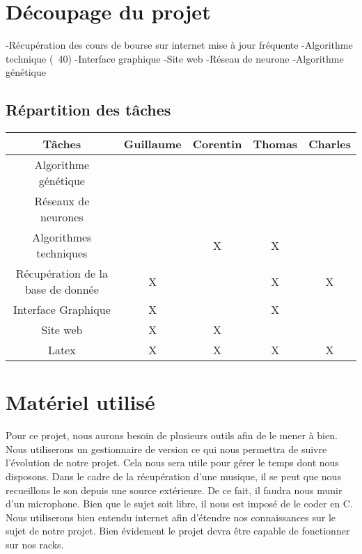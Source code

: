 \documentclass[a4paper,12pt]{article}
\begin{document}
\section{Découpage du projet}

-Récupération des cours de bourse sur internet mise à jour fréquente
-Algorithme technique (~40)
-Interface graphique 
-Site web
-Réseau de neurone 
-Algorithme génétique 

\subsection{Répartition des tâches}
\begin{tabular}{|c||c|c|c|c|}
\hline
Tâches & Guillaume & Corentin & Thomas & Charles\\
\hline
Algorithme génétique & & & & \\
\hline
Réseaux de neurones & & & & \\
\hline
Algorithmes techniques & & X & X & \\
\hline
Récupération de la base de donnée & X & & X & X \\
\hline
Interface Graphique & X & & X &\\
\hline
Site web & X & X & &\\
\hline
Latex & X & X & X & X \\
\hline 
\end{tabular}

\section{Matériel utilisé}

Pour ce projet, nous aurons besoin de plusieurs outils afin de le mener à bien. Nous utiliserons un gestionnaire de version ce qui nous permettra de suivre l'évolution de notre projet. Cela nous sera utile pour gérer le temps dont nous disposons. Dans le cadre de la récupération d'une musique, il se peut que nous recueillons le son depuis une source extérieure. De ce fait, il faudra nous munir d'un microphone. Bien que le sujet soit libre, il nous est imposé de le coder en C. Nous utiliserons bien entendu internet afin d'étendre nos connaissances sur le sujet de notre projet. Bien évidement le projet devra être capable de fonctionner sur nos racks.
\end{document}
